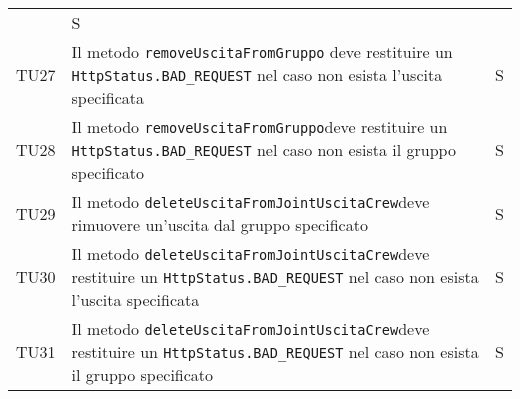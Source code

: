 \begin{center}
{\begin{longtable}{
      |>{\centering\arraybackslash}p{48pt}
      |>{\centering\arraybackslash}p{308pt}
      |>{\centering\arraybackslash}p{27pt}|}
                  & S                                              \\
      TU27
                  & Il metodo \texttt{removeUscitaFromGruppo} deve
      restituire un \texttt{HttpStatus.BAD\_REQUEST} nel caso non esista
      l'uscita
      specificata
                  & S                                              \\
      TU28
                  & Il metodo \texttt{removeUscitaFromGruppo}deve
      restituire un \texttt{HttpStatus.BAD\_REQUEST} nel caso non esista il
      gruppo
      specificato
                  & S                                              \\
      TU29
                  & Il metodo
      \texttt{deleteUscitaFromJointUscitaCrew}deve rimuovere un'uscita dal
      gruppo
      specificato
                  & S                                              \\
      TU30
                  & Il metodo
      \texttt{deleteUscitaFromJointUscitaCrew}deve restituire un
      \texttt{HttpStatus.BAD\_REQUEST} nel caso non esista l'uscita specificata
                  & S
      \\
      TU31
                  & Il metodo
      \texttt{deleteUscitaFromJointUscitaCrew}deve restituire un
      \texttt{HttpStatus.BAD\_REQUEST} nel caso non esista il gruppo
      specificato &
      S
      \\

    \end{longtable}
  }
\end{center}
